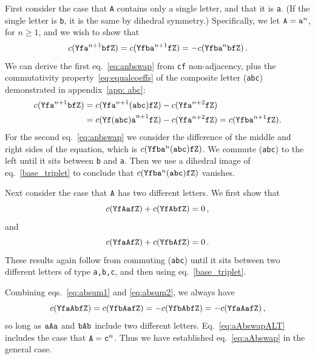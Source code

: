 \documentclass[12pt]{article}
\begin{document}
First consider the case that {\tt A} contains only a single letter, and that it is {\tt a}.  (If the single letter is {\tt b}, it is the same by dihedral symmetry.)
Specifically, we let ${\tt A=a}^n$, for $n\geq 1$, and we wish to show that
%
\begin{equation}
c({\tt Yfa}^{n+1}{\tt bfZ})=c({\tt Yfba}^{n+1}{\tt fZ})=-c({\tt Yfba}^{n}{\tt bfZ}) \,.
\label{eq:anbswap}
\end{equation}
%
We can derive the first eq.~\eqref{eq:anbswap} from {\tt cf} non-adjacency, plus the commutativity property~\eqref{eq:equalcoeffs} of the composite letter ({\tt abc}) demonstrated in appendix~\ref{app: abc}:
%
\begin{equation}
\begin{split}
 c({\tt Yfa}^{n+1}{\tt bfZ}) &= c({\tt Yfa}^{n+1}{\tt (abc)fZ}) - c({\tt Yfa}^{n+2}{\tt fZ}) \\
 &= c({\tt Yf(abc)a}^{n+1}{\tt fZ}) - c({\tt Yfa}^{n+2}{\tt fZ}) = c({\tt Yfba}^{n+1}{\tt fZ}).
\end{split}
\end{equation}
%
For the second eq.~\eqref{eq:anbswap} we consider the difference of the middle and right sides of the equation, which is $c({\tt Yfba}^n{\tt (abc)fZ})$. We commute ({\tt abc}) to the left until it sits between {\tt b} and {\tt a}. Then we use a dihedral image of eq.~\eqref{base_triplet} to conclude that $c({\tt Yfba}^n{\tt (abc)fZ})$ vanishes.

Next consider the case that $\tt A$ has two different letters.  We first show that
\begin{equation}
c({\tt YfAafZ})+c({\tt YfAbfZ})= 0 \,,
\label{eq:absum1}
\end{equation}
and 
\begin{equation}
c({\tt YfaAfZ})+c({\tt YfbAfZ})= 0 \,.
\label{eq:absum2}
\end{equation}
These results again follow from commuting ({\tt abc}) until it sits between two different letters of type {\tt a,b,c}, and then using eq.~\eqref{base_triplet}.

Combining eqs.~\eqref{eq:absum1} and \eqref{eq:absum2}, we always have
\begin{equation}
c({\tt YfaAbfZ})=c({\tt YfbAafZ}) = -c({\tt YfbAbfZ}) = - c({\tt YfaAafZ}) \,,
\label{eq:aAbswapALT}
\end{equation}
so long as $\tt aAa$ and $\tt bAb $ include two different letters.  Eq.~\eqref{eq:aAbswapALT} includes the case that ${\tt A} = {\tt c}^n$.   
Thus we have established eq.~\eqref{eq:aAbswap} in the general case.
\end{document}

